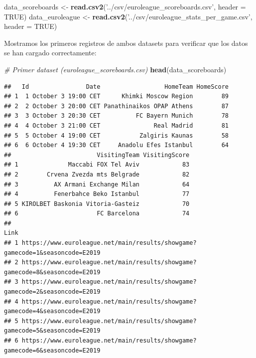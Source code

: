 \documentclass[
]{article}
\newenvironment{Shaded}{\begin{snugshade}}{\end{snugshade}}
\newcommand{\CommentTok}[1]{\textcolor[rgb]{0.56,0.35,0.01}{\textit{#1}}}
\newcommand{\DataTypeTok}[1]{\textcolor[rgb]{0.13,0.29,0.53}{#1}}
\newcommand{\KeywordTok}[1]{\textcolor[rgb]{0.13,0.29,0.53}{\textbf{#1}}}
\newcommand{\NormalTok}[1]{#1}
\newcommand{\OtherTok}[1]{\textcolor[rgb]{0.56,0.35,0.01}{#1}}
\newcommand{\StringTok}[1]{\textcolor[rgb]{0.31,0.60,0.02}{#1}}
\begin{document}
\begin{Shaded}
\begin{Highlighting}[]
\NormalTok{data_scoreboards <-}\StringTok{ }\KeywordTok{read.csv2}\NormalTok{(}\StringTok{'../csv/euroleague_scoreboards.csv'}\NormalTok{, }\DataTypeTok{header =} \OtherTok{TRUE}\NormalTok{)}
\NormalTok{data_euroleague <-}\StringTok{ }\KeywordTok{read.csv2}\NormalTok{(}\StringTok{'../csv/euroleague_stats_per_game.csv'}\NormalTok{, }\DataTypeTok{header =} \OtherTok{TRUE}\NormalTok{)}
\end{Highlighting}
\end{Shaded}

Mostramos los primeros registros de ambos datasets para verificar que
los datos se han cargado correctamente:

\begin{Shaded}
\begin{Highlighting}[]
\CommentTok{# Primer dataset (euroleague_scoreboards.csv)}
\KeywordTok{head}\NormalTok{(data_scoreboards)}
\end{Highlighting}
\end{Shaded}

\begin{verbatim}
##   Id                Date                  HomeTeam HomeScore
## 1  1 October 3 19:00 CET      Khimki Moscow Region        89
## 2  2 October 3 20:00 CET Panathinaikos OPAP Athens        87
## 3  3 October 3 20:30 CET          FC Bayern Munich        78
## 4  4 October 3 21:00 CET               Real Madrid        81
## 5  5 October 4 19:00 CET           Zalgiris Kaunas        58
## 6  6 October 4 19:30 CET     Anadolu Efes Istanbul        64
##                        VisitingTeam VisitingScore
## 1              Maccabi FOX Tel Aviv            83
## 2        Crvena Zvezda mts Belgrade            82
## 3          AX Armani Exchange Milan            64
## 4          Fenerbahce Beko Istanbul            77
## 5 KIROLBET Baskonia Vitoria-Gasteiz            70
## 6                      FC Barcelona            74
##                                                                           Link
## 1 https://www.euroleague.net/main/results/showgame?gamecode=1&seasoncode=E2019
## 2 https://www.euroleague.net/main/results/showgame?gamecode=8&seasoncode=E2019
## 3 https://www.euroleague.net/main/results/showgame?gamecode=2&seasoncode=E2019
## 4 https://www.euroleague.net/main/results/showgame?gamecode=4&seasoncode=E2019
## 5 https://www.euroleague.net/main/results/showgame?gamecode=5&seasoncode=E2019
## 6 https://www.euroleague.net/main/results/showgame?gamecode=6&seasoncode=E2019
\end{verbatim}
\end{document}
